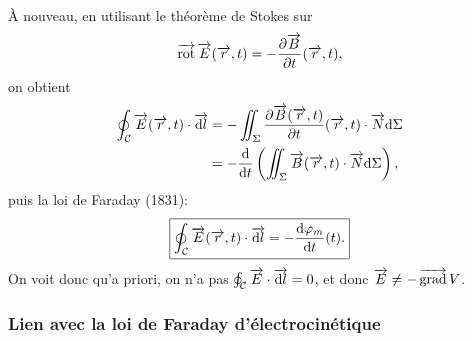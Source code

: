 À nouveau, en utilisant le théorème de Stokes sur
\begin{equation}
    \vecrot\vec{E}(\vec{r},t)=-\frac{\partial\vec{B}}{\partial t}(\vec{r},t),    
\end{equation}
on obtient
\begin{align}
    \oint_{\mathcal{C}}\vec{E}(\vec{r},t)\cdot\vec{\rmd l}
    &=-\iint_{\Sigma}\frac{\partial\vec{B}(\vec{r},t)}{\partial t}(\vec{r},t)\cdot\vec{N}\rmd\Sigma\\
    &=-\frac{\rmd}{\rmd t}\left(\iint_{\Sigma}\vec{B}(\vec{r},t)\cdot\vec{N}\rmd\Sigma\right),
\end{align}
puis la loi de Faraday (1831):
\begin{equation}
    \boxed{
        \oint_{\mathcal{C}}\vec{E}(\vec{r},t)\cdot\vec{\rmd l}=-\frac{\rmd\varphi_m}{\rmd t}(t).
    }
\end{equation}
On voit donc qu'a priori, on n'a pas $\oint_{\mathcal{C}}\vec{E}\cdot\vec{\rmd l}=0$, et donc $\vec{E}\neq-\vecgrad V$.

\subsubsection{Lien avec la loi de Faraday d'électrocinétique}

